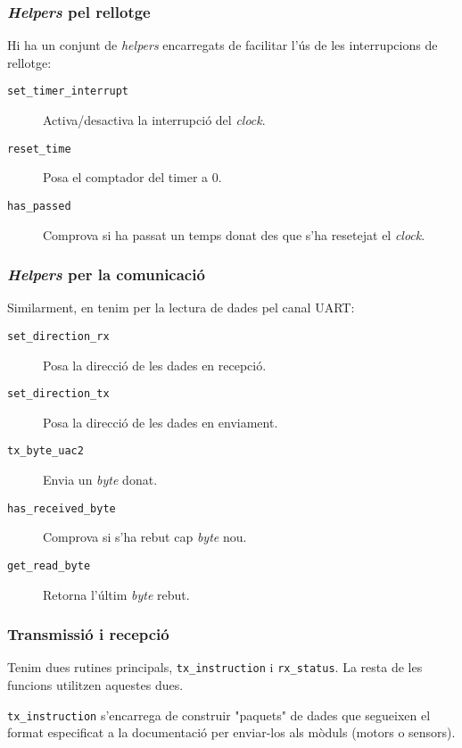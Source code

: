 \documentclass{../pdae} %
\begin{document}
\subsubsection{\textit{Helpers} pel rellotge}

Hi ha un conjunt de \textit{helpers} encarregats de facilitar l'ús de les
interrupcions de rellotge:

\begin{description}
  \item[\texttt{set\_timer\_interrupt}] Activa/desactiva la interrupció del
    \textit{clock}.
  \item[\texttt{reset\_time}] Posa el comptador del timer a 0.
  \item[\texttt{has\_passed}] Comprova si ha passat un temps donat des que s'ha
    resetejat el \textit{clock}.
\end{description}

\subsubsection{\textit{Helpers} per la comunicació}

Similarment, en tenim per la lectura de dades pel canal UART:

\begin{description}
  \item[\texttt{set\_direction\_rx}] Posa la direcció de les dades en recepció.
  \item[\texttt{set\_direction\_tx}] Posa la direcció de les dades en enviament.
  \item[\texttt{tx\_byte\_uac2}] Envia un \textit{byte} donat.
  \item[\texttt{has\_received\_byte}] Comprova si s'ha rebut cap \textit{byte}
    nou.
  \item[\texttt{get\_read\_byte}] Retorna l'últim \textit{byte} rebut.
\end{description}

\subsubsection{Transmissió i recepció}

Tenim dues rutines principals, \texttt{tx\_instruction} i \texttt{rx\_status}.
La resta de les funcions utilitzen aquestes dues.

\texttt{tx\_instruction} s'encarrega de construir "paquets" de dades que
segueixen el format especificat a la documentació per enviar-los als mòduls
(motors o sensors).
\end{document}
